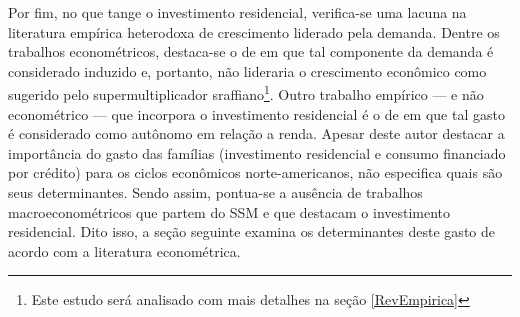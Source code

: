 
Por fim, no que tange o investimento residencial, verifica-se uma lacuna na literatura empírica heterodoxa de crescimento liderado pela demanda. 
Dentre os trabalhos econométricos, destaca-se o de \textcite{arestis_residential_2015} em que tal componente da demanda é considerado induzido e, portanto, não lideraria o crescimento econômico como sugerido pelo supermultiplicador sraffiano\footnote{Este estudo será analisado com mais detalhes na seção \ref{RevEmpirica}}.
Outro trabalho empírico --- e não econométrico --- que incorpora o investimento residencial é o de \textcite{fiebiger_semi-autonomous_2018} em que tal gasto é considerado como autônomo em relação a renda.
Apesar deste autor destacar a importância do gasto das famílias (investimento residencial e consumo financiado por crédito) para os ciclos econômicos norte-americanos, não especifica quais são seus determinantes.
Sendo assim, pontua-se a ausência de trabalhos macroeconométricos que partem do SSM e que destacam o investimento residencial.
Dito isso, a seção seguinte examina os determinantes deste gasto de acordo com a literatura econométrica.  


\begin{comment}
\textcite{deleidi_mission-oriented_2019}, por sua vez, estimam um SVAR para analisar
se o tipo de política fiscal adotada tem impactos sobre o crescimento no caso americano para o período de 1947 a 2018. Em linhas gerais, concluem que gastos orientados em setores mais intensivos em P\&D e em mudanças estrutuais (correspondente ao gasto v) possuem efeitos maiores sobre a taxa de crescimento do que uma política centrada apenas em incentivos fiscais. 

Vale retomar a compatibilidade do investimento residencial com o modelo do supermultiplicador sraffiano uma vez que (i) não cria   capacidade produtiva ao setor privado e (ii) pelas hipotecas serem a principal forma de financiamento (e não salários) de acordo com o \textit{Survey of Construction} \cite{us_census_bureau_characteristics_2017}. 
\end{comment}